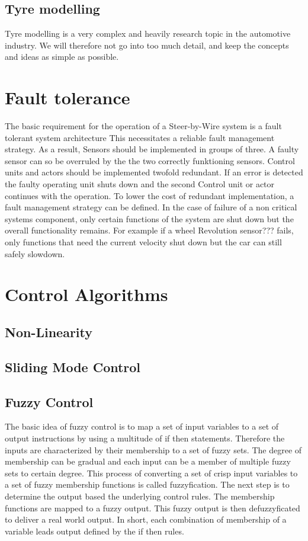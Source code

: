 \documentclass[conference]{IEEEtran}
\begin{document}
\subsection{Tyre modelling}

Tyre modelling is a very complex and heavily research topic in the automotive industry. We will therefore not go into too much detail, and keep the concepts and ideas as simple as possible.

\section{Fault tolerance}
The basic requirement for the operation of a Steer-by-Wire system is a fault tolerant system architecture %
This necessitates a reliable fault management strategy.
As a result, Sensors should be implemented in groups of three. A faulty sensor can so be overruled by the the two correctly funktioning sensors. Control units and actors should be implemented twofold redundant. If an error is detected the faulty operating unit shuts down and the second Control unit or actor continues with the operation. To lower the cost of redundant implementation, a fault management strategy can be defined. In the case of failure of a non critical systems component, only certain functions of the system are shut down but the overall functionality remains. For example if a wheel Revolution sensor??? fails, only functions that need the current velocity shut down but the car can still safely slowdown.

\section{Control Algorithms}
\subsection{Non-Linearity}
\subsection{Sliding Mode Control}
\subsection{Fuzzy Control}
The basic idea of fuzzy control is to map a set of input variables to a set of output instructions
by using a multitude of if then statements. Therefore the inputs are characterized by their
membership to a set of fuzzy sets. The degree of membership can be gradual and each input can 
be a member of multiple fuzzy sets to certain degree. This process of converting a set of crisp
input variables to a set of fuzzy membership functions is called fuzzyfication. The next step
is to determine the output based the underlying control rules. The membership functions are
mapped to a fuzzy output. This fuzzy output is then defuzzyficated to deliver a real world output.
In short, each combination of membership of a variable leads output defined by the if then rules.
\end{document}
